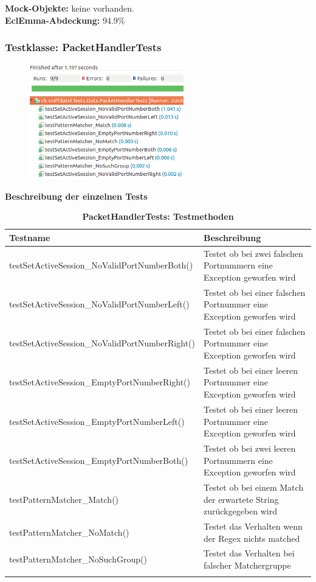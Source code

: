 \documentclass[a4,12pt]{scrartcl}
\begin{document}
\noindent \textbf{Mock-Objekte:} keine vorhanden.\\
\textbf{EclEmma-Abdeckung:} 94.9\%

\subsubsection{Testklasse: PacketHandlerTests}
\begin{figure} [H]
	\begin{center}
	\includegraphics[width=0.60\textwidth]{./pictures/PacketHandlerTests.png}
	\label{Bild Referenz}
	\end{center}
\end{figure}

\textbf{Beschreibung der einzelnen Tests}
\begin{longtable}{ p{9cm} p{6.5cm} }    
    {Testname} & {Beschreibung}\\ \midrule
    testSetActiveSession\_NoValidPortNumberBoth() & Testet ob bei zwei falschen Portnummern eine Exception geworfen wird\\ \addlinespace
    testSetActiveSession\_NoValidPortNumberLeft() & Testet ob bei einer falschen Portnummer eine Exception geworfen wird\\ \addlinespace
    testSetActiveSession\_NoValidPortNumberRight() & Testet ob bei einer falschen Portnummer eine Exception geworfen wird\\ \addlinespace
    testSetActiveSession\_EmptyPortNumberRight() & Testet ob bei einer leeren Portnummer eine Exception geworfen wird\\ \addlinespace
    testSetActiveSession\_EmptyPortNumberLeft() & Testet ob bei einer leeren Portnummer eine Exception geworfen wird\\ \addlinespace
    testSetActiveSession\_EmptyPortNumberBoth() & Testet ob bei zwei leeren Portnummern eine Exception geworfen wird\\ \addlinespace
  	testPatternMatcher\_Match() & Testet ob bei einem Match der erwartete String zurückgegeben wird\\ \addlinespace
    testPatternMatcher\_NoMatch() & Testet das Verhalten wenn der Regex nichts matched\\ \addlinespace
    testPatternMatcher\_NoSuchGroup() & Testet das Verhalten bei falscher Matchergruppe\\ 
\caption{\textbf{PacketHandlerTests: Testmethoden}}
\end{longtable}
\end{document}

